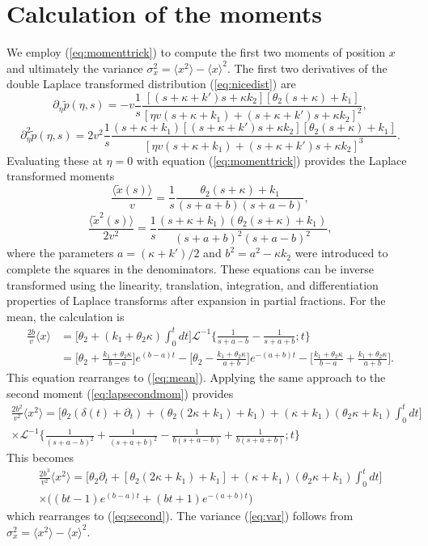 \documentclass[]{agujournal2018}
\newcommand\be{\begin{equation}}
\newcommand\ee{\end{equation}}
\newcommand\bra{\langle}
\newcommand\ket{\rangle}
\newcommand\tp{\tilde{p}}
\newcommand\El{\mathcal{L}}
\begin{document}
\section{Calculation of the moments}
\label{sec:appendixB}
We employ (\ref{eq:momenttrick}) to compute the first two moments of position $x$ and ultimately the variance $\sigma_x^2 = \bra x^2\ket - \bra x \ket^2$. The first two derivatives of the double Laplace transformed distribution (\ref{eq:nicedist}) are
\be \partial_\eta \tp(\eta,s) = -v \frac{1}{s}\frac{[(s+\kappa + k')s + \kappa k_2][\theta_2(s+\kappa) + k_1]}{[\eta v(s+\kappa +k_1) + (s+ \kappa + k')s+\kappa k_2]^2},\ee
\be \partial_\eta^2 \tp(\eta,s) = 2v^2 \frac{1}{s} \frac{(s+\kappa+k_1)[(s+\kappa + k')s+\kappa k_2][\theta_2(s+\kappa) + k_1]}{[\eta v(s+\kappa + k_1) + (s+\kappa + k')s+ \kappa k_2]^3}.\ee
Evaluating these at $\eta=0$ with equation (\ref{eq:momenttrick}) provides the Laplace transformed moments
\be  \frac{\bra\tilde{x}(s)\ket} {v} = \frac{1}{s} \frac{\theta_2(s+\kappa)+k_1}{(s+a+b)(s+a-b)}\label{eq:lapmean},\ee
\be \frac{\bra \tilde{x}^2(s) \ket}{2v^2} = \frac{1}{s}\frac{(s+\kappa+k_1)(\theta_2(s+\kappa)+k_1)}{(s+a+b)^2(s+a-b)^2},\label{eq:lapsecondmom}\ee
where the parameters $a= (\kappa+k')/2$ and $b^2 = a^2 -\kappa k_2$ were introduced to complete the squares in the denominators.
These equations can be inverse transformed using the linearity, translation, integration, and differentiation properties of Laplace transforms \citep[e.g.][]{Arfken1985} after expansion in partial fractions.
For the mean, the calculation is
\begin{align}
\frac{2b}{v}\bra x \ket &= \big[\theta_2 + (k_1+\theta_2 \kappa)\int_0^t dt\big]\El^{-1}\Big\{ \frac{1}{s+a-b}-\frac{1}{s+a+b};t\Big\}\\
&= \Big[\theta_2 + \frac{k_1+\theta_2\kappa}{b-a}\Big]e^{(b-a)t} - \Big[\theta_2 - \frac{k_1+\theta_2\kappa}{a+b}\Big]e^{-(a+b)t} - \Big[\frac{k_1+\theta_2\kappa}{b-a} + \frac{k_1+\theta_2\kappa}{a+b}\Big].
\end{align}
This equation rearranges to (\ref{eq:mean}).
Applying the same approach to the second moment (\ref{eq:lapsecondmom}) provides
\begin{multline}
\frac{2b^2}{v^2}\bra x^2 \ket = \Big[\theta_2(\delta(t) + \partial_t) + (\theta_2(2\kappa + k_1)+k_1) + (\kappa+k_1)(\theta_2\kappa+k_1)\int_0^t dt \Big] \\
\times \El^{-1}\Big\{ \frac{1}{(s+a-b)^2} + \frac{1}{(s+a+b)^2}-\frac{1}{b(s+a-b)}+\frac{1}{b(s+a+b)};t\Big\}
\end{multline}
This becomes 
\begin{multline}
\frac{2b^3}{v^2}\bra x^2 \ket = \Big[\theta_2\partial_t + [\theta_2(2\kappa+k_1)+k_1] + (\kappa+k_1)(\theta_2\kappa+k_1)\int_0^tdt\Big]\\
\times \Big((bt-1)e^{(b-a)t}+(bt+1)e^{-(a+b)t}\Big)
\end{multline}
which rearranges to (\ref{eq:second}).
The variance (\ref{eq:var}) follows from $\sigma_x^2 = \bra x^2 \ket - \bra x \ket^2.$
\end{document}

